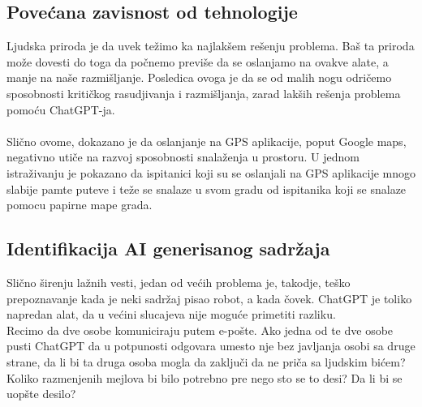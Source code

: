 \documentclass[fleqn, 12pt]{article}
\begin{document}
    \subsection{Povećana zavisnost od tehnologije}
        \begin{text}
            Ljudska priroda je da uvek težimo ka najlakšem rešenju problema. Baš ta priroda može dovesti do toga da počnemo previše da se oslanjamo na ovakve alate, a manje na naše razmišljanje. Posledica ovoga je da se od malih nogu odričemo sposobnosti kritičkog rasudjivanja i razmišljanja, zarad lakših rešenja problema pomoću ChatGPT-ja.
            \\\\
            Slično ovome, dokazano je da oslanjanje na GPS aplikacije, poput Google maps, negativno utiče na razvoj sposobnosti snalaženja u prostoru. U jednom istraživanju je pokazano da ispitanici koji su se oslanjali na GPS aplikacije mnogo slabije pamte puteve i teže se snalaze u svom gradu od ispitanika koji se snalaze pomocu papirne mape grada. \cite{G5}
            
        \end{text}

    \subsection{Identifikacija AI generisanog sadržaja}
        \begin{text}
            Slično širenju lažnih vesti, jedan od većih problema je, takodje, teško prepoznavanje kada je neki sadržaj pisao robot, a kada čovek. ChatGPT je toliko napredan alat, da u većini slucajeva nije moguće primetiti razliku.
            \\
            Recimo da dve osobe komuniciraju putem e-pošte. Ako jedna od te dve osobe pusti ChatGPT da u potpunosti odgovara umesto nje bez javljanja osobi sa druge strane, da li bi ta druga osoba mogla da zaključi da ne priča sa ljudskim bićem? Koliko razmenjenih mejlova bi bilo potrebno pre nego sto se to desi? Da li bi se uopšte desilo?
        \end{text}
\end{document}
